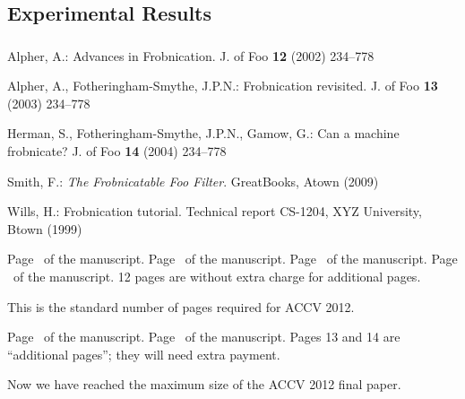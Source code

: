 \documentclass[runningheads]{llncs}
\begin{document}
\subsection{Experimental Results}

\subsubsection {}





\begin{thebibliography}{1}

Alpher, A.:
Advances in Frobnication.
J. of Foo
\textbf{12} (2002)  234--778

Alpher, A., Fotheringham-Smythe, J.P.N.:
Frobnication revisited.
J. of Foo
\textbf{13} (2003)  234--778

Herman, S., Fotheringham-Smythe, J.P.N., Gamow, G.:
Can a machine frobnicate?
J. of Foo
\textbf{14} (2004)  234--778

Smith, F.:
{\it The Frobnicatable Foo Filter}.
GreatBooks, Atown (2009)

Wills, H.:
Frobnication tutorial.
Technical report CS-1204, XYZ University, Btown (1999)

\end{thebibliography}


\clearpage\mbox{}Page \thepage\ of the manuscript.
\clearpage\mbox{}Page \thepage\ of the manuscript.
\clearpage\mbox{}Page \thepage\ of the manuscript.
\clearpage\mbox{}Page \thepage\ of the manuscript.
12 pages are without extra charge for additional pages.
\par\vfill\par
This is the standard number of pages required for ACCV 2012.

\clearpage\mbox{}Page \thepage\ of the manuscript.
\clearpage\mbox{}Page \thepage\ of the manuscript.
Pages 13 and 14 are ``additional pages''; they will need extra payment.
\par\vfill\par
Now we have reached the maximum size of the ACCV 2012 final paper.
\end{document}
